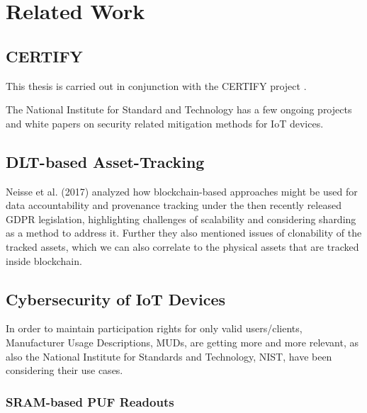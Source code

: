 \chapter{Related Work}


\section{CERTIFY} %
\label{sec:CERTIFY}

This thesis is carried out in conjunction with the CERTIFY project \cite{certifyproject2023}.

The National Institute for Standard and Technology has a few ongoing projects and white papers on security related
mitigation methods for IoT devices.



\section{DLT-based Asset-Tracking} %
\label{sec:DLT-based Asset-Tracking}

Neisse et al. (2017) analyzed how blockchain-based approaches might be used for data accountability and provenance
tracking under the then recently released GDPR legislation, highlighting challenges of scalability and considering
sharding as a method to address it. \cite{neisse2017blockchain} Further they also mentioned issues of clonability of
the tracked assets, which we can also correlate to the physical assets that are tracked inside blockchain.



\section{Cybersecurity of IoT Devices} %
\label{sec:Cybersecurity of IoT Devices}


In order to maintain participation rights for only valid users/clients, Manufacturer Usage Descriptions, MUDs, are
getting more and more relevant, as also the National Institute for Standards and Technology, NIST, have been considering
their use cases. \cite{dodson2021securing}


\subsection{SRAM-based PUF Readouts} %
\label{sub:SRAM-based PUF Readouts}

